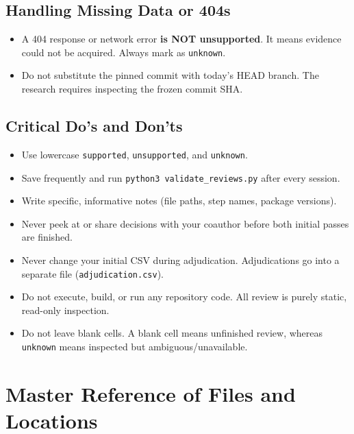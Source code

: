 \documentclass[11pt,a4paper]{article}
\begin{document}
\subsection{Handling Missing Data or 404s}
\begin{itemize}
  \item A 404 response or network error \textbf{is NOT unsupported}. It means evidence could not be acquired. Always mark as \nolinkurl{unknown}.
  \item Do not substitute the pinned commit with today's HEAD branch. The research requires inspecting the frozen commit SHA.
\end{itemize}

\subsection{Critical Do's and Don'ts}
\begin{itemize}[leftmargin=18pt]
  \item[\textcolor{taskgreen}{\textbf{DO:}}] Use lowercase \nolinkurl{supported}, \nolinkurl{unsupported}, and \nolinkurl{unknown}.
  \item[\textcolor{taskgreen}{\textbf{DO:}}] Save frequently and run \nolinkurl{python3 validate_reviews.py} after every session.
  \item[\textcolor{taskgreen}{\textbf{DO:}}] Write specific, informative notes (file paths, step names, package versions).
  \item[\textcolor{taskaccent}{\textbf{DON'T:}}] Never peek at or share decisions with your coauthor before both initial passes are finished.
  \item[\textcolor{taskaccent}{\textbf{DON'T:}}] Never change your initial CSV during adjudication. Adjudications go into a separate file (\nolinkurl{adjudication.csv}).
  \item[\textcolor{taskaccent}{\textbf{DON'T:}}] Do not execute, build, or run any repository code. All review is purely static, read-only inspection.
  \item[\textcolor{taskaccent}{\textbf{DON'T:}}] Do not leave blank cells. A blank cell means unfinished review, whereas \nolinkurl{unknown} means inspected but ambiguous/unavailable.
\end{itemize}

\section{Master Reference of Files and Locations}
\end{document}
